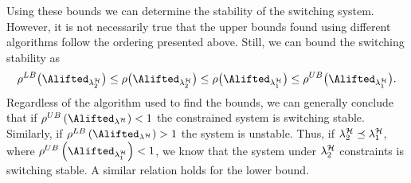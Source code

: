 Using these bounds we can determine the stability of the switching system.
However, it is not necessarily true that the upper bounds found using different algorithms follow the ordering presented above.
Still, we can bound the switching stability as
%
$$
\rho^{LB} \bigl( \Alifted_{\lambda^\strat_2} \bigr) \leq \rho \bigl( \Alifted_{\lambda^\strat_2}
\bigr) \leq \rho \bigl( \Alifted_{\lambda^\strat_1} \bigr) \leq \rho^{UB} \bigl(
\Alifted_{\lambda^\strat_1} \bigr).
$$
%
Regardless of the algorithm used to find the bounds, we can generally conclude that if $\rho^{UB} \left( \Alifted_{\lambda^\strat} \right) < 1$ the constrained system is switching stable.
Similarly, if $\rho^{LB} \left( \Alifted_{\lambda^\strat} \right) > 1$ the system is unstable.
Thus, if $\lambda^{\mathcal{H}}_2 \preceq \lambda^{\mathcal{H}}_1$, where $\rho^{UB} \left( \Alifted_{\lambda^\strat_1} \right) < 1$, we know that the system under $\lambda^{\mathcal{H}}_2$ constraints is switching stable.
A similar relation holds for the lower bound.

